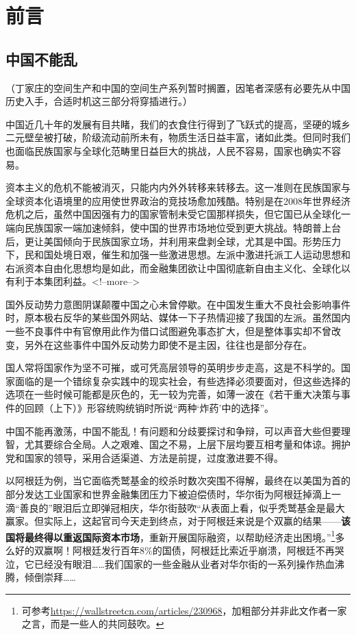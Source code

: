\chapter{前言}

\section{中国不能乱}

（丁家庄的空间生产和中国的空间生产系列暂时搁置，因笔者深感有必要先从中国历史入手，合适时机这三部分将穿插进行。）

中国近几十年的发展有目共睹，我们的衣食住行得到了飞跃式的提高，坚硬的城乡二元壁垒被打破，阶级流动前所未有，物质生活日益丰富，诸如此类。但同时我们也面临民族国家与全球化范畴里日益巨大的挑战，人民不容易，国家也确实不容易。

资本主义的危机不能被消灭，只能内内外外转移来转移去。这一准则在民族国家与全球资本化语境里的应用使世界政治的竞技场愈加残酷。特别是在2008年世界经济危机之后，虽然中国因强有力的国家管制未受它国那样损失，但它国已从全球化一端向民族国家一端加速倾斜，使中国的世界市场地位受到更大挑战。特朗普上台后，更让美国倾向于民族国家立场，并利用来盘剥全球，尤其是中国。形势压力下，民和国处境日艰，催生和加强一些激进思想。左派中激进托派工人运动思想和右派资本自由化思想均是如此，而金融集团欲让中国彻底新自由主义化、全球化以有利于本集团利益。<!--more-->

国外反动势力意图阴谋颠覆中国之心未曾停歇。在中国发生重大不良社会影响事件时，原本极右反华的某些国外网站、媒体一下子热情迎接了我国的左派。虽然国内一些不良事件中有官僚用此作为借口试图避免事态扩大，但是整体事实却不曾改变，另外在这些事件中国外反动势力即使不是主因，往往也是部分存在。

国人常将国家作为坚不可摧，或可凭高层领导的英明步步走高，这是不科学的。国家面临的是一个错综复杂实践中的现实社会，有些选择必须要面对，但这些选择的选项在一些时候可能都是灰色的，无一较为完善，如薄一波在《若干重大决策与事件的回顾（上下）》形容统购统销时所说“两种`炸药'中的选择”。

中国不能再激荡，中国不能乱！有问题和分歧要探讨和争辩，可以声音大些但要理智，尤其要综合全局。人之艰难、国之不易，上层下层均要互相考量和体谅。拥护党和国家的领导，采用合适渠道、方法是前提，过度激进要不得。

以阿根廷为例，当它面临秃鹫基金的绞杀时数次突围不得解，最终在以美国为首的部分发达工业国家和世界金融集团压力下被迫偿债时，华尔街为阿根廷掉滴上一滴“善良的”眼泪后立即弹冠相庆，华尔街鼓吹“从表面上看，似乎秃鹫基金是最大赢家。但实际上，这起官司今天走到终点，对于阿根廷来说是个双赢的结果——\textbf{该国将最终得以重返国际资本市场}，重新开展国际融资，以帮助经济走出困境。”\footnote{可参考\url{https://wallstreetcn.com/articles/230968}，加粗部分并非此文作者一家之言，而是一些人的共同鼓吹。}多么好的双赢啊！阿根廷发行百年8\%的国债，阿根廷比索近乎崩溃，阿根廷不再哭泣，它已经没有眼泪……我们国家的一些金融从业者对华尔街的一系列操作热血沸腾，倾倒崇拜……

